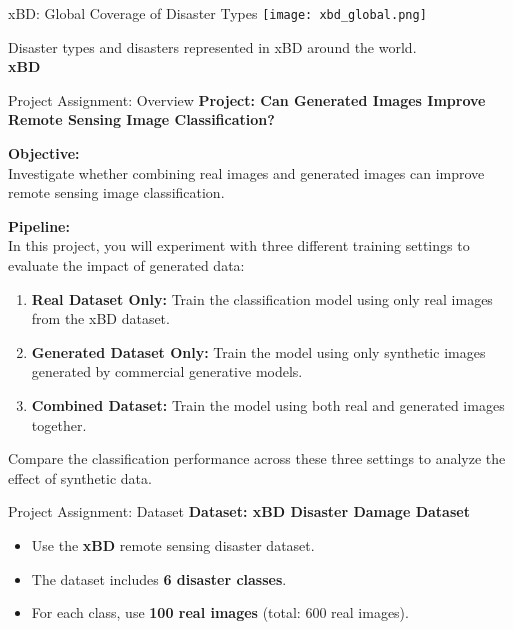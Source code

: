 \begin{refsection}
  \begin{frame}{xBD: Global Coverage of Disaster Types}
    \centering
    \texttt{[image: xbd\_global.png]}
    
    \vspace{0.5em}
    \scriptsize
    Disaster types and disasters represented in xBD around the world.\\
    \textbf{xBD}~\parencite{guptaCreatingXBDDataset2019}
    \bottomleftrefs
  \end{frame}
\end{refsection}

\begin{refsection}
  \begin{frame}{Project Assignment: Overview}
    \textbf{Project: Can Generated Images Improve Remote Sensing Image Classification?}
  
    \vspace{0.7em}
    \textbf{Objective:}\\
    Investigate whether combining real images and generated images can improve remote sensing image classification.

    \vspace{1em}
    \textbf{Pipeline:}\\
    In this project, you will experiment with three different training settings to evaluate the impact of generated data:
    \begin{enumerate}
      \item \textbf{Real Dataset Only:} Train the classification model using only real images from the xBD dataset.
      \item \textbf{Generated Dataset Only:} Train the model using only synthetic images generated by commercial generative models.
      \item \textbf{Combined Dataset:} Train the model using both real and generated images together.
    \end{enumerate}
    Compare the classification performance across these three settings to analyze the effect of synthetic data.

    \bottomleftrefs
  \end{frame}
\end{refsection}
  
\begin{refsection}
  \begin{frame}{Project Assignment: Dataset}
    \textbf{Dataset: xBD Disaster Damage Dataset}
    \begin{itemize}
      \item Use the \textbf{xBD} remote sensing disaster dataset.
      \item The dataset includes \textbf{6 disaster classes}.
      \item For each class, use \textbf{100 real images} (total: 600 real images).
    \end{itemize}
    \bottomleftrefs
  \end{frame}
  \end{refsection}
  
